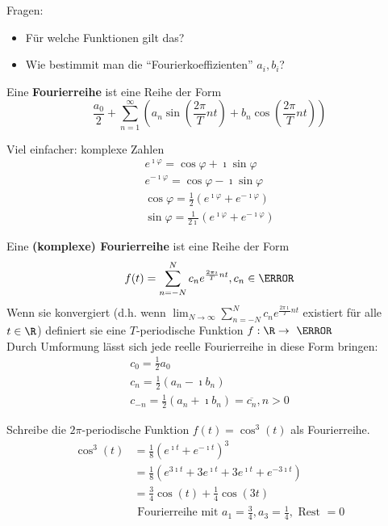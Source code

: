 Fragen:
\begin{itemize}
	\item Für welche Funktionen gilt das?
	\item Wie bestimmit man die \enquote{Fourierkoeffizienten} $a_i, b_i$?
\end{itemize}
\begin{def*}[note = Fourierreihe , index = Fourier reihe , indexformat = {1!~.2 2!1.~}]
	Eine \textbf{Fourierreihe} ist eine Reihe der Form
	\[ \frac{a_0}{2} + \sum_{n=1}^\infty \left( a_n \sin\left( \frac{2\pi}{T} nt \right) + b_n \cos\left( \frac{2\pi}{T} nt \right) \right) \]
\end{def*}
Viel einfacher: komplexe Zahlen
\begin{gather*}
	e^{\imath \varphi} = \cos \varphi + \imath \sin \varphi \\
	e^{-\imath \varphi} = \cos \varphi - \imath \sin \varphi \\
	\cos \varphi = \frac{1}{2} \left( e^{\imath \varphi} + e^{-\imath \varphi} \right) \\
	\sin \varphi = \frac{1}{2\imath} \left( e^{\imath \varphi} + e^{-\imath \varphi} \right)
\end{gather*}
\begin{def*}[note = komplexe Fourierreihe , index = komplexe Fourier reihe , indexformat = {2!~.3!1~ 3!2.~!1~}]
	Eine \textbf{(komplexe) Fourierreihe} ist eine Reihe der Form
	\[ f(t) = \sum_{n=-N}^N c_n e^{\frac{2\pi\imath}{T} nt} , c_n \in \C \]
	Wenn sie konvergiert (d.h. wenn $\lim_{N \rightarrow \infty} \sum_{n=-N}^N c_n e^{\frac{2\pi\imath}{T} nt}$ existiert für alle $t \in \R$) definiert sie eine $T$-periodische Funktion $f: \R \rightarrow \C$ \\
	Durch Umformung lässt sich jede reelle Fourierreihe in diese Form bringen:
	\begin{gather*}
		c_0 = \frac{1}{2} a_0 \\
		c_n = \frac{1}{2} \left( a_n - \imath b_n \right) \\
		c_{-n} = \frac{1}{2} \left( a_n + \imath b_n \right) = \overline{c_n} , n > 0
	\end{gather*}
\end{def*} 
\begin{bsp*}
	Schreibe die $2\pi$-periodische Funktion $f(t) = \cos^3(t)$ als Fourierreihe.
	\[ \begin{split}
		\cos^3(t)	&= \frac{1}{8} \left( e^{\imath t} + e^{-\imath t} \right)^3 \\
				&= \frac{1}{8} \left( e^{3\imath t} + 3e^{\imath t} + 3e^{\imath t} + e^{-3\imath t} \right) \\
				&= \frac{3}{4} \cos(t) + \frac{1}{4} \cos(3t) \\
				&\text{ Fourierreihe mit } a_1 = \frac{3}{4} , a_3 = \frac{1}{4} , \text{ Rest } = 0
	\end{split}\]
\end{bsp*}

